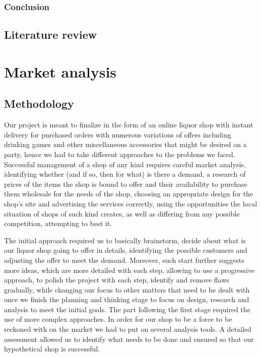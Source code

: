 \documentclass[12p]{article}
\begin{document}

\subsubsection{Conclusion}



\subsection{Literature review}


\newpage
\section{Market analysis} \label{MarketAnalysis}


\subsection{Methodology} \label{Methodology}
Our project is meant to finalize in the form of an online liquor shop with instant delivery for purchased orders with numerous variations of offers including drinking games and other miscellaneous accessories that might be desired on a party, hence we had to take different approaches to the problems we faced. Successful management of a shop of any kind requires careful market analysis, identifying whether (and if so, then for what) is there a demand, a research of prices of the items the shop is bound to offer and their availability to purchase them wholesale for the needs of the shop, choosing an appropriate design for the shop’s site and advertising the services correctly, using the opportunities the local situation of shops of such kind creates, as well as differing from any possible competition, attempting to best it. 

The initial approach required us to basically brainstorm, decide about what is our liquor shop going to offer in details, identifying the possible customers and adjusting the offer to meet the demand. Moreover, such start further suggests more ideas, which are more detailed with each step, allowing to use a progressive approach, to polish the project with each step, identify and remove flaws gradually, while changing our focus to other matters that need to be dealt with once we finish the planning and thinking stage to focus on design, research and analysis to meet the initial goals.
The part following the first stage required the use of more complex approaches. In order for our shop to be a force to be reckoned with on the market we had to put on several analysis tools. A detailed assessment allowed us to identify what needs to be done and ensured so that our hypothetical shop is successful. 
\end{document}
